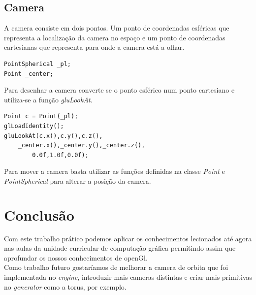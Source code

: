 \documentclass[a4paper]{report}
\begin{document}
\section{Camera}
A camera consiste em dois pontos. Um ponto de coordenadas esféricas que
representa a localização da camera no espaço e um ponto de coordenadas
cartesianas que representa para onde a camera está a olhar.\\
\begin{lstlisting}
PointSpherical _pl;
Point _center;
\end{lstlisting}
Para desenhar a camera converte se o ponto esférico num ponto cartesiano e
utiliza-se a função \textit{gluLookAt}.
\begin{lstlisting}
Point c = Point(_pl);
glLoadIdentity();
gluLookAt(c.x(),c.y(),c.z(), 
	_center.x(),_center.y(),_center.z(),
		0.0f,1.0f,0.0f);
\end{lstlisting}
Para mover a camera basta utilizar as funções definidas na classe \textit{Point}
e \textit{PointSpherical} para alterar a posição da camera.

\chapter{Conclusão}
Com este trabalho prático podemos aplicar os conhecimentos lecionados até agora
nas aulas da unidade curricular de computação gráfica permitindo assim que
aprofundar os nossos conhecimentos de openGl.\\
Como trabalho futuro gostaríamos de melhorar a camera de orbita que foi
implementada no \textit{engine}, introduzir mais cameras distintas e criar mais
primitivas no \textit{generator} como a torus, por exemplo.
\end{document}
